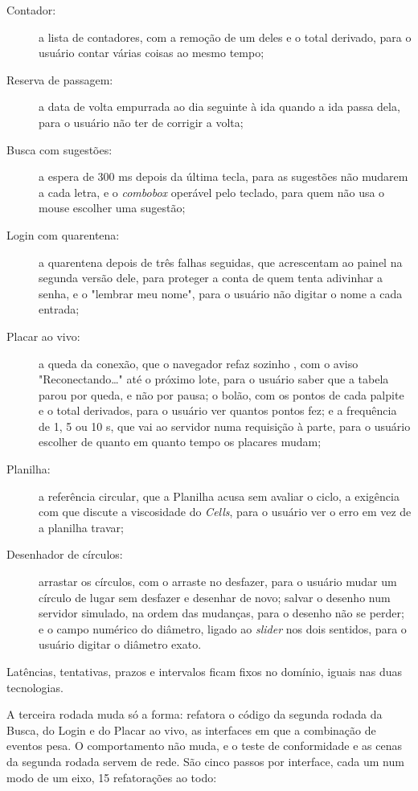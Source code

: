 \begin{description}
\item[{Contador:}] a lista de contadores, com a remoção de um deles e o
total derivado, para o usuário contar várias coisas ao mesmo tempo;
\item[{Reserva de passagem:}] a data de volta empurrada ao dia seguinte à
ida quando a ida passa dela, para o usuário não ter de corrigir a
volta;
\item[{Busca com sugestões:}] a espera de 300 ms depois da última tecla,
para as sugestões não mudarem a cada letra, e o \emph{combobox} operável
pelo teclado, para quem não usa o mouse escolher uma sugestão;
\item[{Login com quarentena:}] a quarentena depois de três falhas seguidas,
que \textcite[p. 539]{berry2020} acrescentam ao painel na segunda
versão dele, para proteger a conta de quem tenta adivinhar a senha, e
o "lembrar meu nome", para o usuário não digitar o nome a cada
entrada;
\item[{Placar ao vivo:}] a queda da conexão, que o navegador refaz sozinho
\cite[§ 9.2.1]{whatwg2026}, com o aviso "Reconectando…" até o
próximo lote, para o usuário saber que a tabela parou por queda, e não
por pausa; o bolão, com os pontos de cada palpite e o total
derivados, para o usuário ver quantos pontos fez; e a frequência de 1,
5 ou 10 s, que vai ao servidor numa requisição à parte, para o usuário
escolher de quanto em quanto tempo os placares mudam;
\item[{Planilha:}] a referência circular, que a Planilha acusa sem avaliar o
ciclo, a exigência com que \textcite[p. 54]{kiss2014} discute a
viscosidade do \emph{Cells}, para o usuário ver o erro em vez de a planilha
travar;
\item[{Desenhador de círculos:}] arrastar os círculos, com o arraste no
desfazer, para o usuário mudar um círculo de lugar sem desfazer e
desenhar de novo; salvar o desenho num servidor simulado, na ordem
das mudanças, para o desenho não se perder; e o campo numérico do
diâmetro, ligado ao \emph{slider} nos dois sentidos, para o usuário
digitar o diâmetro exato.
\end{description}

Latências, tentativas, prazos e intervalos ficam fixos no domínio,
iguais nas duas tecnologias.

A terceira rodada muda só a forma: refatora o código da segunda rodada
da Busca, do Login e do Placar ao vivo, as interfaces em que a
combinação de eventos pesa.
O comportamento não muda, e o teste de conformidade e as cenas da
segunda rodada servem de rede.
São cinco passos por interface, cada um num modo de um eixo, 15
refatorações ao todo:

